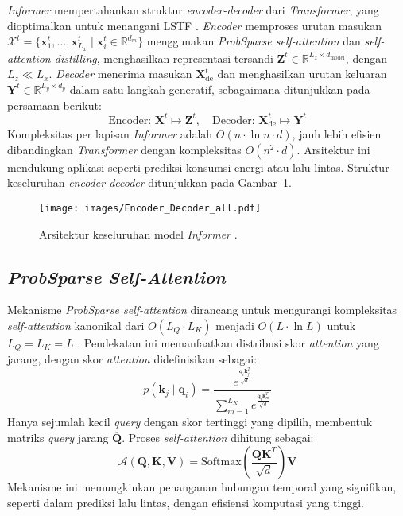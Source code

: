 \textit{Informer} mempertahankan struktur \textit{encoder-decoder} dari \textit{Transformer}, yang dioptimalkan untuk menangani LSTF \citep{Zhou2021}. \textit{Encoder} memproses urutan masukan \( \mathcal{X}^t = \{ \mathbf{x}_1^t, \ldots, \mathbf{x}_{L_x}^t \mid \mathbf{x}_i^t \in \mathbb{R}^{d_m} \} \) menggunakan \textit{ProbSparse self-attention} dan \textit{self-attention distilling}, menghasilkan representasi tersandi \( \mathbf{Z}^t \in \mathbb{R}^{L_z \times d_{\text{model}}} \), dengan \( L_z \ll L_x \). \textit{Decoder} menerima masukan \( \mathbf{X}_{\text{de}}^t \) dan menghasilkan urutan keluaran \( \mathbf{Y}^t \in \mathbb{R}^{L_y \times d_y} \) dalam satu langkah generatif, sebagaimana ditunjukkan pada persamaan berikut:
\begin{equation}
\text{Encoder: } \mathbf{X}^t \mapsto \mathbf{Z}^t, \quad \text{Decoder: } \mathbf{X}_{\text{de}}^t \mapsto \mathbf{Y}^t
\end{equation}
Kompleksitas per lapisan \textit{Informer} adalah \( O(n \cdot \ln n \cdot d) \), jauh lebih efisien dibandingkan \textit{Transformer} dengan kompleksitas \( O(n^2 \cdot d) \). Arsitektur ini mendukung aplikasi seperti prediksi konsumsi energi atau lalu lintas. Struktur keseluruhan \textit{encoder-decoder} ditunjukkan pada Gambar~\ref{fig:encoder_decoder}.

\begin{figure}[H]
    \centering
    \texttt{[image: images/Encoder\_Decoder\_all.pdf]}
    \caption{Arsitektur keseluruhan model \textit{Informer} \citep{Zhou2021}.}
    \label{fig:encoder_decoder}
\end{figure}

\subsection{\textit{ProbSparse Self-Attention}}
\label{sec:probsparse}

Mekanisme \textit{ProbSparse self-attention} dirancang untuk mengurangi kompleksitas \textit{self-attention} kanonikal dari \( O(L_Q \cdot L_K) \) menjadi \( O(L \cdot \ln L) \) untuk \( L_Q = L_K = L \) \citep{Zhou2021}. Pendekatan ini memanfaatkan distribusi skor \textit{attention} yang jarang, dengan skor \textit{attention} didefinisikan sebagai:
\begin{equation}
p(\mathbf{k}_j \mid \mathbf{q}_i) = \frac{e^{\frac{\mathbf{q}_i \mathbf{k}_j^T}{\sqrt{d}}}}{\sum_{m=1}^{L_K} e^{\frac{\mathbf{q}_i \mathbf{k}_m^T}{\sqrt{d}}}}
\end{equation}
Hanya sejumlah kecil \textit{query} dengan skor tertinggi yang dipilih, membentuk matriks \textit{query} jarang \( \overline{\mathbf{Q}} \). Proses \textit{self-attention} dihitung sebagai:
\begin{equation}
\mathcal{A}(\mathbf{Q}, \mathbf{K}, \mathbf{V}) = \text{Softmax}\left( \frac{\overline{\mathbf{Q}} \mathbf{K}^T}{\sqrt{d}} \right) \mathbf{V}
\end{equation}
Mekanisme ini memungkinkan penanganan hubungan temporal yang signifikan, seperti dalam prediksi lalu lintas, dengan efisiensi komputasi yang tinggi.

